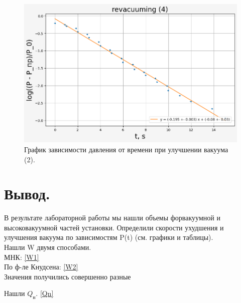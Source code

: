 \documentclass[a4paper,12pt]{article}
\begin{document}
  \begin{figure} [H]
    \centering
    \includegraphics[scale=0.8]{plot4.png}
    \caption{График зависимости давления от времени при улучшении вакуума (2).
  ~\label{plot:second_revacuuming}}
  \end{figure}

\section{Вывод.}
В результате лабораторной работы мы нашли объемы форвакуумной и высоковакуумной частей установки. Определили скорости ухудшения и улучшения вакуума по зависимостям P(t) (см. графики и таблицы).\\

Нашли W двумя способами.\\
МНК: \ref{W1}\\
По ф-ле Кнудсена: \ref{W2}\\

Значения получились совершенно разные 


Нашли $Q_\text{н}$. \ref{Qn}\\
\end{document}
